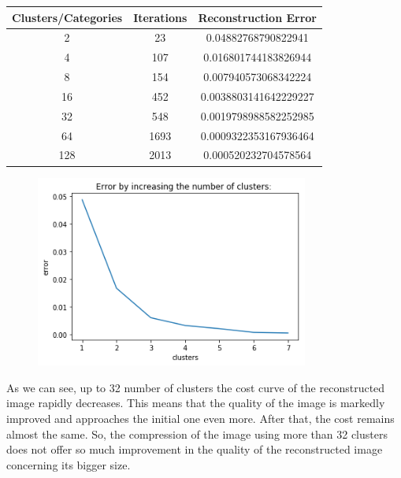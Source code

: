 \documentclass[11pt]{article}
\begin{document}
\begin{center}
 \begin{tabular}{||c c c||} 
 
 \hline
 Clusters/Categories & Iterations & Reconstruction Error \\ [1ex] 
 \hline\hline
 2 & 23 & 0.04882768790822941 \\ [1ex]
 \hline 
 4 & 107 & 0.016801744183826944  \\ [1ex]
 \hline
 8 & 154 & 0.007940573068342224 \\ [1ex]
 \hline
 16 & 452 & 0.0038803141642229227 \\[1ex]
 \hline
 32 & 548 & 0.0019798988582252985 \\ [1ex]
 \hline
 64 & 1693 & 0.0009322353167936464 \\ [1ex]
 \hline
 128 & 2013 & 0.000520232704578564 \\ [1ex] 
 \hline
\end{tabular}
\end{center}


     \begin{figure}[H]
		\centering
		\includegraphics[width=0.8\textwidth]{./Project_2_files/Project_2_33_20.png}
	\end{figure}

As we can see, up to 32 number of clusters the cost curve of the reconstructed image rapidly decreases. This means that the quality of the image is markedly improved and    approaches the initial one even more. After that, the cost remains almost the same. So, the compression of the image using more than 32 clusters does not offer so much improvement in the quality of the reconstructed image concerning its bigger size.

\newpage
\nocite{*}
 
\underline{}

\end{document}
